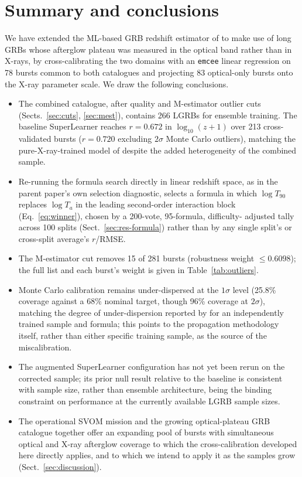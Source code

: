 \documentclass{aa}
\newcommand{\Ta}{T_a}
\newcommand{\logz}{\log_{10}(z+1)}
\begin{document}
\section{Summary and conclusions}
\label{sec:conclusions}

We have extended the ML-based GRB redshift estimator of \citet{narendra2025}
to make use of long GRBs whose afterglow plateau was measured in the optical
band rather than in X-rays, by cross-calibrating the two domains with an
\texttt{emcee} linear regression on 78 bursts common to both catalogues and
projecting 83 optical-only bursts onto the X-ray parameter scale. We draw the
following conclusions.

\begin{itemize}
\item The combined catalogue, after quality and M-estimator outlier cuts
  (Sects.~\ref{sec:cuts}, \ref{sec:mest}), contains 266 LGRBs for ensemble
  training. The baseline SuperLearner reaches $r=0.672$ in $\logz$ over 213
  cross-validated bursts ($r=0.720$ excluding $2\sigma$ Monte Carlo outliers),
  matching the pure-X-ray-trained model of \citet{narendra2025} despite the
  added heterogeneity of the combined sample.
\item Re-running the formula search directly in linear redshift space, as in
  the parent paper's own selection diagnostic, selects a formula in which
  $\log T_{90}$ replaces $\log \Ta$ in the leading second-order interaction
  block (Eq.~\ref{eq:winner}), chosen by a 200-vote, 95-formula, difficulty-
  adjusted tally across 100 splits (Sect.~\ref{sec:res-formula}) rather than
  by any single split's or cross-split average's $r$/RMSE.
\item The M-estimator cut removes 15 of 281 bursts (robustness weight
  $\leq0.6098$); the full list and each burst's weight is given in
  Table~\ref{tab:outliers}.
\item Monte Carlo calibration remains under-dispersed at the $1\sigma$ level
  (25.8\% coverage against a 68\% nominal target, though 96\% coverage at
  $2\sigma$), matching the degree of under-dispersion reported by
  \citet{narendra2025} for an independently trained sample and formula; this
  points to the propagation methodology itself, rather than either specific
  training sample, as the source of the miscalibration.
\item The augmented SuperLearner configuration has not yet been rerun on the
  corrected sample; its prior null result relative to the baseline is
  consistent with sample size, rather than ensemble architecture, being the
  binding constraint on performance at the currently available LGRB sample
  sizes.
\item The operational SVOM mission and the growing optical-plateau GRB
  catalogue together offer an expanding pool of bursts with simultaneous
  optical and X-ray afterglow coverage to which the cross-calibration
  developed here directly applies, and to which we intend to apply it as the
  samples grow (Sect.~\ref{sec:discussion}).
\end{itemize}
\end{document}
